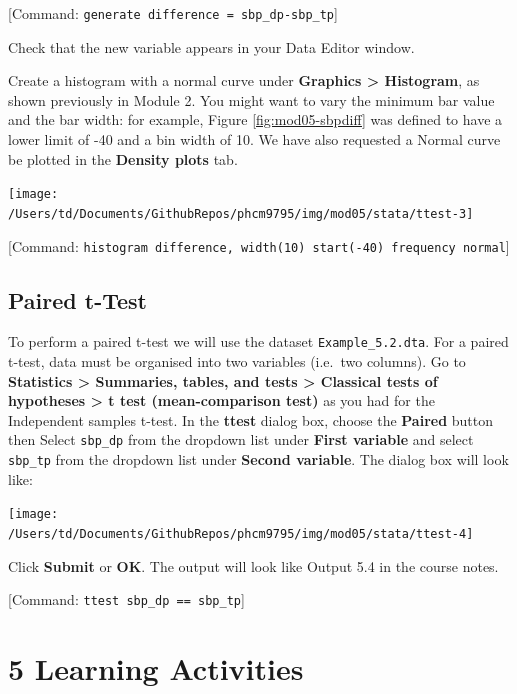 \documentclass[
]{memoir}
\begin{document}
{[}Command: \texttt{generate\ difference\ =\ sbp\_dp-sbp\_tp}{]}

Check that the new variable appears in your Data Editor window.

Create a histogram with a normal curve under \textbf{Graphics \textgreater{} Histogram}, as shown previously in Module 2. You might want to vary the minimum bar value and the bar width: for example, Figure \ref{fig:mod05-sbpdiff} was defined to have a lower limit of -40 and a bin width of 10. We have also requested a Normal curve be plotted in the \textbf{Density plots} tab.

\texttt{[image: /Users/td/Documents/GithubRepos/phcm9795/img/mod05/stata/ttest-3]}

{[}Command: \texttt{histogram\ difference,\ width(10)\ start(-40)\ frequency\ normal}{]}

\hypertarget{paired-t-test}{%
\section{Paired t-Test}\label{paired-t-test}}

To perform a paired t-test we will use the dataset \texttt{Example\_5.2.dta}. For a paired t-test, data must be organised into two variables (i.e.~two columns). Go to \textbf{Statistics \textgreater{} Summaries, tables, and tests \textgreater{} Classical tests of hypotheses \textgreater{} t test (mean-comparison test)} as you had for the Independent samples t-test. In the \textbf{ttest} dialog box, choose the \textbf{Paired} button then Select \texttt{sbp\_dp} from the dropdown list under \textbf{First variable} and select \texttt{sbp\_tp} from the dropdown list under \textbf{Second variable}. The dialog box will look like:

\texttt{[image: /Users/td/Documents/GithubRepos/phcm9795/img/mod05/stata/ttest-4]}

Click \textbf{Submit} or \textbf{OK}. The output will look like Output 5.4 in the course notes.

{[}Command: \texttt{ttest\ sbp\_dp\ ==\ sbp\_tp}{]}

\hypertarget{learning-activities-4}{%
\chapter*{\texorpdfstring{\textbf{5} Learning Activities}{5 Learning Activities}}\label{learning-activities-4}}
\end{document}

